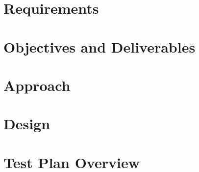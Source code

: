 \documentclass[hidelinks, 12pt]{article} %
\begin{document}
		\newpage
		\section{Requirements}
		\label{Requirements}
		
		\pagebreak
		
		\newpage
		\section{Objectives and Deliverables}
		\label{Objectives and Deliverables}
		
		\pagebreak
		
		\newpage
		\section{Approach}
		\label{Approach}
		
		\pagebreak
		
		\newpage
		\section{Design}
		\label{Design}
		
		\pagebreak
		
		\newpage
		\section{Test Plan Overview}
		\label{Test Plan Overview}
		
		\pagebreak
		
		\newpage
\end{document}
